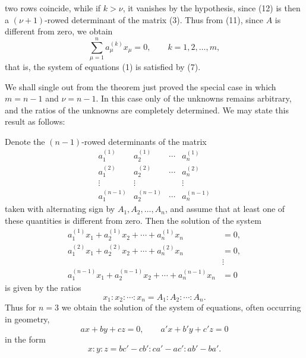 
two rows coincide, while if \(k>\nu\), it vanishes by the hypothesis, since (12) is then a \((\nu+1)\)-rowed determinant of the matrix (3). Thus from (11), since \(A\) is different from zero, we obtain
\begin{equation}
        \sum_{\mu=1}^{n}a_\mu^{(k)}x_\mu=0,\qquad k=1,2,\ldots,m,
\tag{13}
\end{equation}
that is, the system of equations (1) is satisfied by (7).

We shall single out from the theorem just proved the special case in which \(m=n-1\) and \(\nu=n-1\). In this case only  of the unknowns remains arbitrary, and the ratios of the unknowns are completely determined. We may state this result as follows:

Denote the \((n-1)\)-rowed determinants of the matrix
\begin{equation}
\begin{array}{cccc}
 a_1^{(1)}&a_2^{(1)}&\cdots&a_n^{(1)}\\
 a_1^{(2)}&a_2^{(2)}&\cdots&a_n^{(2)}\\
 \vdots&\vdots&&\vdots\\
 a_1^{(n-1)}&a_2^{(n-1)}&\cdots&a_n^{(n-1)}
\end{array}
\tag{14}
\end{equation}
taken with alternating sign by \(A_1,A_2,\ldots,A_n\), and assume that at least one of these quantities is different from zero. Then the solution of the system
\begin{equation}
\begin{aligned}
 a_1^{(1)}x_1+a_2^{(1)}x_2+\cdots+a_n^{(1)}x_n&=0,\\
 a_1^{(2)}x_1+a_2^{(2)}x_2+\cdots+a_n^{(2)}x_n&=0,\\
 &\vdots\\
 a_1^{(n-1)}x_1+a_2^{(n-1)}x_2+\cdots+a_n^{(n-1)}x_n&=0
\end{aligned}
\tag{15}
\end{equation}
is given by the ratios
\begin{equation}
        x_1:x_2:\cdots:x_n=A_1:A_2:\cdots:A_n.
\tag{16}
\end{equation}
Thus for \(n=3\) we obtain the solution of the system of equations, often occurring in geometry,
\begin{equation}
        ax+by+cz=0,\qquad a'x+b'y+c'z=0
\tag{17}
\end{equation}
in the form
\begin{equation}
        x:y:z=bc'-cb':ca'-ac':ab'-ba'.
\tag{18}
\end{equation}
